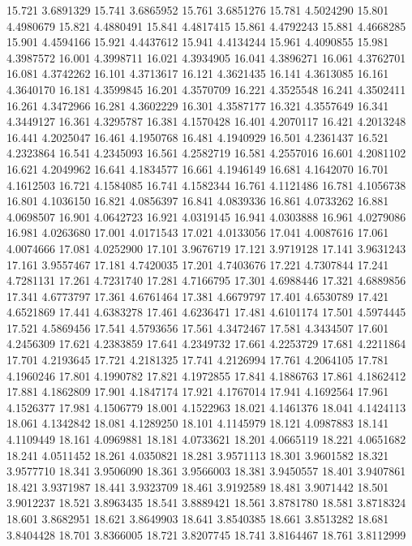 15.721 3.6891329
15.741 3.6865952
15.761 3.6851276
15.781 4.5024290
15.801 4.4980679
15.821 4.4880491
15.841 4.4817415
15.861 4.4792243
15.881 4.4668285
15.901 4.4594166
15.921 4.4437612
15.941 4.4134244
15.961 4.4090855
15.981 4.3987572
16.001 4.3998711
16.021 4.3934905
16.041 4.3896271
16.061 4.3762701
16.081 4.3742262
16.101 4.3713617
16.121 4.3621435
16.141 4.3613085
16.161 4.3640170
16.181 4.3599845
16.201 4.3570709
16.221 4.3525548
16.241 4.3502411
16.261 4.3472966
16.281 4.3602229
16.301 4.3587177
16.321 4.3557649
16.341 4.3449127
16.361 4.3295787
16.381 4.1570428
16.401 4.2070117
16.421 4.2013248
16.441 4.2025047
16.461 4.1950768
16.481 4.1940929
16.501 4.2361437
16.521 4.2323864
16.541 4.2345093
16.561 4.2582719
16.581 4.2557016
16.601 4.2081102
16.621 4.2049962
16.641 4.1834577
16.661 4.1946149
16.681 4.1642070
16.701 4.1612503
16.721 4.1584085
16.741 4.1582344
16.761 4.1121486
16.781 4.1056738
16.801 4.1036150
16.821 4.0856397
16.841 4.0839336
16.861 4.0733262
16.881 4.0698507
16.901 4.0642723
16.921 4.0319145
16.941 4.0303888
16.961 4.0279086
16.981 4.0263680
17.001 4.0171543
17.021 4.0133056
17.041 4.0087616
17.061 4.0074666
17.081 4.0252900
17.101 3.9676719
17.121 3.9719128
17.141 3.9631243
17.161 3.9557467
17.181 4.7420035
17.201 4.7403676
17.221 4.7307844
17.241 4.7281131
17.261 4.7231740
17.281 4.7166795
17.301 4.6988446
17.321 4.6889856
17.341 4.6773797
17.361 4.6761464
17.381 4.6679797
17.401 4.6530789
17.421 4.6521869
17.441 4.6383278
17.461 4.6236471
17.481 4.6101174
17.501 4.5974445
17.521 4.5869456
17.541 4.5793656
17.561 4.3472467
17.581 4.3434507
17.601 4.2456309
17.621 4.2383859
17.641 4.2349732
17.661 4.2253729
17.681 4.2211864
17.701 4.2193645
17.721 4.2181325
17.741 4.2126994
17.761 4.2064105
17.781 4.1960246
17.801 4.1990782
17.821 4.1972855
17.841 4.1886763
17.861 4.1862412
17.881 4.1862809
17.901 4.1847174
17.921 4.1767014
17.941 4.1692564
17.961 4.1526377
17.981 4.1506779
18.001 4.1522963
18.021 4.1461376
18.041 4.1424113
18.061 4.1342842
18.081 4.1289250
18.101 4.1145979
18.121 4.0987883
18.141 4.1109449
18.161 4.0969881
18.181 4.0733621
18.201 4.0665119
18.221 4.0651682
18.241 4.0511452
18.261 4.0350821
18.281 3.9571113
18.301 3.9601582
18.321 3.9577710
18.341 3.9506090
18.361 3.9566003
18.381 3.9450557
18.401 3.9407861
18.421 3.9371987
18.441 3.9323709
18.461 3.9192589
18.481 3.9071442
18.501 3.9012237
18.521 3.8963435
18.541 3.8889421
18.561 3.8781780
18.581 3.8718324
18.601 3.8682951
18.621 3.8649903
18.641 3.8540385
18.661 3.8513282
18.681 3.8404428
18.701 3.8366005
18.721 3.8207745
18.741 3.8164467
18.761 3.8112999
